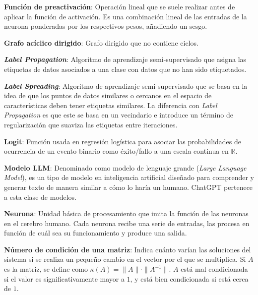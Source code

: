\begin{description}
  \item \textbf{Función de preactivación}: Operación lineal que se suele realizar antes de aplicar la función de activación. Es una combinación lineal de las entradas de la neurona ponderadas por los respectivos pesos, añadiendo un sesgo.

  \item \textbf{Grafo acíclico dirigido}: Grafo dirigido que no contiene ciclos.

  \item \textbf{\textit{Label Propagation}}: Algoritmo de aprendizaje semi-supervisado que asigna las etiquetas de datos asociados a una clase con  datos que no han sido etiquetados.

  \item \textbf{\textit{Label Spreading}}: Algoritmo de aprendizaje semi-supervisado que se basa en la idea de que los puntos de datos similares o cercanos en el espacio de características deben tener etiquetas similares. La diferencia con \textit{Label Propagation} es que este se basa en un vecindario e introduce un término de regularización que suaviza las etiquetas entre iteraciones.

  \item \textbf{Logit}: Función usada en regresión logística para asociar las probabilidades de ocurrencia de un evento binario como éxito/fallo a una escala continua en $\mathbb{R}$.

  \item \textbf{Modelo LLM}: Denominado como modelo de lenguaje grande (\textit{Large Language Model}), es un tipo de modelo en inteligencia artificial diseñado para comprender y generar texto de manera similar a cómo lo haría un humano. ChatGPT pertenece a esta clase de modelos.

  \item \textbf{Neurona}: Unidad básica de procesamiento que imita la función de las neuronas en el cerebro humano. Cada neurona recibe una serie de entradas, las procesa en función de cuál sea su funcionamiento y produce una salida.

  \item \textbf{Número de condición de una matriz}: Indica cuánto varían las soluciones del sistema si se realiza un pequeño cambio en el vector por el que se multiplica. Si $A$ es la matriz, se define como $\kappa(A) = \|A\| \cdot \|A^{-1}\|$. $A$ está mal condicionada si el valor es significativamente mayor a $1$, y está bien condicionada si está cerca de $1$.
\end{description}
\endinput
